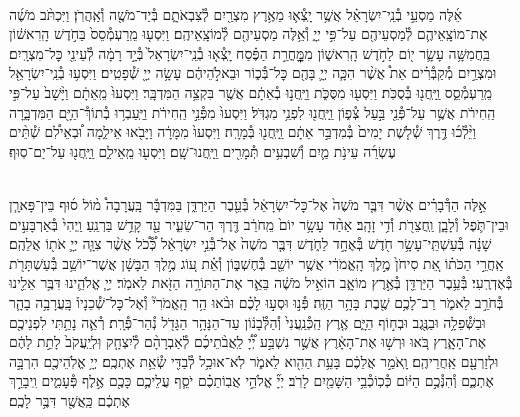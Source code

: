 \documentclass[twoside, openany, parskip=half, 11pt]{book}
\begin{document}
\begin{footnotesize}
\begin{multicols}{2}
\\
אֵ֜לֶּה מַסְעֵ֣י בְ֯נֵֽי־יִשְׂרָאֵ֗ל אֲשֶׁ֥ר יָֽצְ֯א֛וּ מֵאֶ֥רֶץ מִצְרַ֖יִם לְ֯צִבְאֹתָ֑ם בְּ֯יַד־מֹשֶׁ֖ה וְ֯אַֽהֲרֹֽן׃ וַיִּכְתֹּ֨ב מֹשֶׁ֜ה אֶת־מוֹצָֽאֵיהֶ֛ם לְ֯מַסְעֵיהֶ֖ם עַל־פִּ֣י יְיָ֑ וְ֯אֵ֥לֶּה מַסְעֵיהֶ֖ם לְ֯מוֹצָֽאֵיהֶֽם׃ וַיִּסְע֤וּ מֵֽרַעְמְ֯סֵס֙ בַּחֹ֣דֶשׁ הָֽרִאשׁ֔וֹן בַּֽחֲמִשָּׁ֥ה עָשָׂ֛ר י֖וֹם לַחֹ֣דֶשׁ הָֽרִאשׁ֑וֹן מִמׇׇׇׇׇׇׇׇׇׇׇׇּֽחֳרַ֣ת הַפֶּ֗סַח יָֽצְ֯א֤וּ בְ֯נֵֽי־יִשְׂרָאֵל֙ בְּ֯יָ֣ד רָמָ֔ה לְ֯עֵינֵ֖י כׇּל־מִצְרָֽיִם׃  וּמִצְרַ֣יִם מְ֯קַבְּ֯רִ֗ים אֵת֩ אֲשֶׁ֨ר הִכָּ֧ה יְיָ֛ בָּהֶ֖ם כׇּל־בְּ֯כ֑וֹר וּבֵאלֹ֣הֵיהֶ֔ם עָשָׂ֥ה יְיָ֖ שְׁ֯פָטִֽים׃ וַיִּסְע֥וּ בְ֯נֵֽי־יִשְׂרָאֵ֖ל מֵֽרַעְמְ֯סֵ֑ס וַֽיַּֽחֲנ֖וּ בְּ֯סֻכֹּֽת׃ וַיִּסְע֖וּ מִסֻּכֹּ֑ת וַיַּֽחֲנ֣וּ בְ֯אֵתָ֔ם אֲשֶׁ֖ר בִּקְצֵ֥ה הַמִּדְבָּֽר׃  וַיִּסְעוּ֙ מֵֽאֵתָ֔ם וַיָּ֨שָׁב֙ עַל־פִּ֣י הַֽחִירֹ֔ת אֲשֶׁ֥ר עַל־פְּ֯נֵ֖י בַּ֣עַל צְ֯פ֑וֹן וַֽיַּֽחֲנ֖וּ לִפְנֵ֥י מִגְדֹּֽל׃ וַיִּסְעוּ֙ מִפְּ֯נֵ֣י הַֽחִירֹ֔ת וַיַּֽעַבְר֥וּ בְ֯תוֹךְ֯־הַיָּ֖ם הַמִּדְבָּ֑רָה וַיֵּ֨לְ֯כ֜וּ דֶּ֣רֶךְ שְׁ֯לֹ֤שֶׁת יָמִים֙ בְּ֯מִדְבַּ֣ר אֵתָ֔ם וַֽיַּֽחֲנ֖וּ בְּ֯מָרָֽה׃ וַיִּסְעוּ֙ מִמָּרָ֔ה וַיָּבֹ֖אוּ אֵילִ֑מָה וּ֠בְאֵילִ֠ם שְׁ֯תֵּ֨ים עֶשְׂרֵ֜ה עֵינֹ֥ת מַ֛יִם וְ֯שִׁבְעִ֥ים תְּ֯מָרִ֖ים וַֽיַּֽחֲנוּ־שָֽׁם׃ וַיִּסְע֖וּ מֵֽאֵילִ֑ם וַֽיַּֽחֲנ֖וּ עַל־יַם־סֽוּף׃

\\
אֵ֣לֶּה הַדְּ֯בָרִ֗ים אֲשֶׁ֨ר דִּבֶּ֤ר מֹשֶׁה֙ אֶל־כׇּל־יִשְׂרָאֵ֔ל בְּ֯עֵ֖בֶר הַיַּרְדֵּ֑ן בַּמִּדְבָּ֡ר בָּֽעֲרָבָה֩ מ֨וֹל ס֜וּף בֵּין־פָּארָ֧ן וּבֵין־תֹּ֛פֶל וְ֯לָבָ֑ן וַֽחֲצֵרֹ֖ת וְ֯דִ֥י זָהָֽב׃ אַחַ֨ד עָשָׂ֥ר יוֹם֙ מֵֽחֹרֵ֔ב דֶּ֖רֶךְ הַר־שֵׂעִ֑יר עַ֖ד קָדֵ֥שׁ בַּרְנֵֽעַ׃ וַֽיְהִי֙ בְּ֯אַרְבָּעִ֣ים שָׁנָ֔ה בְּ֯עַשְׁתֵּֽי־עָשָׂ֥ר חֹ֖דֶשׁ בְּ֯אֶחָ֣ד לַחֹ֑דֶשׁ דִּבֶּ֤ר מֹשֶׁה֙ אֶל־בְּ֯נֵ֣י יִשְׂרָאֵ֔ל כְּ֠֯כֹ֠ל אֲשֶׁ֨ר צִוָּ֧ה יְיָ֛ אֹת֖וֹ אֲלֵהֶֽם׃  אַֽחֲרֵ֣י הַכֹּת֗וֹ אֵ֚ת סִיחֹן֙ מֶ֣לֶךְ הָֽאֱמֹרִ֔י אֲשֶׁ֥ר יוֹשֵׁ֖ב בְּ֯חֶשְׁבּ֑וֹן וְ֯אֵ֗ת ע֚וֹג מֶ֣לֶךְ הַבָּשָׁ֔ן אֲשֶׁר־יוֹשֵׁ֥ב בְּ֯עַשְׁתָּרֹ֖ת בְּ֯אֶדְרֶֽעִי׃ בְּ֯עֵ֥בֶר הַיַּרְדֵּ֖ן בְּ֯אֶ֣רֶץ מוֹאָ֑ב הוֹאִ֣יל מֹשֶׁ֔ה בֵּאֵ֛ר אֶת־הַתּוֹרָ֥ה הַזֹּ֖את לֵאמֹֽר׃ יְיָ֧ אֱלֹהֵ֛ינוּ דִּבֶּ֥ר אֵלֵ֖ינוּ בְּ֯חֹרֵ֣ב לֵאמֹ֑ר רַב־לָכֶ֥ם שֶׁ֖בֶת בָּהָ֥ר הַזֶּֽה׃ פְּ֯נ֣וּ וּסְע֣וּ לָכֶ֗ם וּבֹ֨אוּ הַ֥ר הָֽאֱמֹרִי֘ וְ֯אֶל־כׇּל־שְׁ֯כֵנָיו֒ בָּֽעֲרָבָ֥ה בָהָ֛ר וּבַשְּׁ֯פֵלָ֥ה וּבַנֶּ֖גֶב וּבְח֣וֹף הַיָּ֑ם אֶ֤רֶץ הַֽכְּ֯נַֽעֲנִי֙ וְ֯הַלְּ֯בָנ֔וֹן עַד־הַנָּהָ֥ר הַגָּדֹ֖ל נְ֯הַר־פְּ֯רָֽת׃  רְ֯אֵ֛ה נָתַ֥תִּי לִפְנֵיכֶ֖ם אֶת־הָאָ֑רֶץ בֹּ֚אוּ וּרְשׁ֣וּ אֶת־הָאָ֔רֶץ אֲשֶׁ֣ר נִשְׁבַּ֣ע יְ֠יָ֠ לַֽאֲבֹ֨תֵיכֶ֜ם לְ֯אַבְרָהָ֨ם לְ֯יִצְחָ֤ק וּֽלְיַֽעֲקֹב֙ לָתֵ֣ת לָהֶ֔ם וּלְזַרְעָ֖ם אַֽחֲרֵיהֶֽם׃ וָֽאֹמַ֣ר אֲלֵכֶ֔ם בָּעֵ֥ת הַהִ֖וא לֵאמֹ֑ר לֹֽא־אוּכַ֥ל לְ֯בַדִּ֖י שְׂ֯אֵ֥ת אֶתְכֶֽם׃ יְיָ֥ אֱלֹֽהֵיכֶ֖ם הִרְבָּ֣ה אֶתְכֶ֑ם וְ֯הִנְּ֯כֶ֣ם הַיּ֔וֹם כְּ֯כֽוֹכְ֯בֵ֥י הַשָּׁמַ֖יִם לָרֹֽב׃ יְיָ֞ אֱלֹהֵ֣י אֲבֽוֹתֵכֶ֗ם יֹסֵ֧ף עֲלֵיכֶ֛ם כָּכֶ֖ם אֶ֣לֶף פְּ֯עָמִ֑ים וִֽיבָרֵ֣ךְ אֶתְכֶ֔ם כַּֽאֲשֶׁ֖ר דִּבֶּ֥ר לָכֶֽם׃


\end{multicols}
\end{footnotesize}
\end{document}

